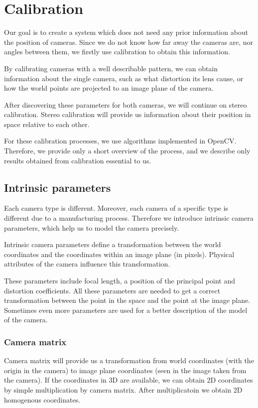 \chapter{Calibration}

Our goal is to create a system which does not need any prior information about the
position of cameras. Since we do not know how far away the cameras are, nor
angles between them, we firstly use calibration to obtain this information.

By calibrating cameras with a well describable pattern, we can obtain
information about the single camera, such as what distortion its lens cause, or
how the world points are projected to an image plane of the camera.

After discovering these parameters for both cameras, we will continue on stereo
calibration. Stereo calibration will provide us information about their
position in space relative to each other.

For these calibration processes, we use algorithms implemented in OpenCV.
Therefore, we provide only a short overview of the process, and we describe
only results obtained from calibration essential to us.

\section{Intrinsic parameters}

Each camera type is different. Moreover, each camera of a specific type is
different due to a manufacturing process. Therefore we introduce intrinsic
camera parameters, which help us to model the camera precisely.

Intrinsic camera parameters define a transformation between the world coordinates and
the coordinates within an image plane (in pixels). Physical attributes of the
camera influence this transformation.

These parameters include focal length, a position of the principal point and
distortion coefficients. All these parameters are needed to get a correct
transformation between the point in the space and the point at the image plane.
Sometimes even more parameters are used for a better description of the model
of the camera.

\subsection{Camera matrix} 

Camera matrix will provide us a transformation from
world coordinates (with the origin in the camera) to image plane coordinates
(seen in the image taken from the camera). If the coordinates in 3D are
available, we can obtain 2D coordinates by simple multiplication by camera
matrix. After multiplicatoin we obtain 2D homogenous coordinates.

